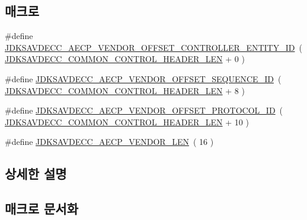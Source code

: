 \subsection*{매크로}
\begin{DoxyCompactItemize}
\item 
\#define \hyperlink{group__aecp__vendor_ga35db9ab2969950eb2f60b85451701a8f}{J\+D\+K\+S\+A\+V\+D\+E\+C\+C\+\_\+\+A\+E\+C\+P\+\_\+\+V\+E\+N\+D\+O\+R\+\_\+\+O\+F\+F\+S\+E\+T\+\_\+\+C\+O\+N\+T\+R\+O\+L\+L\+E\+R\+\_\+\+E\+N\+T\+I\+T\+Y\+\_\+\+ID}~( \hyperlink{group__jdksavdecc__avtp__common__control__header_gaae84052886fb1bb42f3bc5f85b741dff}{J\+D\+K\+S\+A\+V\+D\+E\+C\+C\+\_\+\+C\+O\+M\+M\+O\+N\+\_\+\+C\+O\+N\+T\+R\+O\+L\+\_\+\+H\+E\+A\+D\+E\+R\+\_\+\+L\+EN} + 0 )
\item 
\#define \hyperlink{group__aecp__vendor_gad7cb4c2aee7217166a1d64ff3939ded9}{J\+D\+K\+S\+A\+V\+D\+E\+C\+C\+\_\+\+A\+E\+C\+P\+\_\+\+V\+E\+N\+D\+O\+R\+\_\+\+O\+F\+F\+S\+E\+T\+\_\+\+S\+E\+Q\+U\+E\+N\+C\+E\+\_\+\+ID}~( \hyperlink{group__jdksavdecc__avtp__common__control__header_gaae84052886fb1bb42f3bc5f85b741dff}{J\+D\+K\+S\+A\+V\+D\+E\+C\+C\+\_\+\+C\+O\+M\+M\+O\+N\+\_\+\+C\+O\+N\+T\+R\+O\+L\+\_\+\+H\+E\+A\+D\+E\+R\+\_\+\+L\+EN} + 8 )
\item 
\#define \hyperlink{group__aecp__vendor_gaabcbf488c312106438cf554c418de5d1}{J\+D\+K\+S\+A\+V\+D\+E\+C\+C\+\_\+\+A\+E\+C\+P\+\_\+\+V\+E\+N\+D\+O\+R\+\_\+\+O\+F\+F\+S\+E\+T\+\_\+\+P\+R\+O\+T\+O\+C\+O\+L\+\_\+\+ID}~( \hyperlink{group__jdksavdecc__avtp__common__control__header_gaae84052886fb1bb42f3bc5f85b741dff}{J\+D\+K\+S\+A\+V\+D\+E\+C\+C\+\_\+\+C\+O\+M\+M\+O\+N\+\_\+\+C\+O\+N\+T\+R\+O\+L\+\_\+\+H\+E\+A\+D\+E\+R\+\_\+\+L\+EN} + 10 )
\item 
\#define \hyperlink{group__aecp__vendor_ga0990c9611ccba4fb9c53c02c431efcbb}{J\+D\+K\+S\+A\+V\+D\+E\+C\+C\+\_\+\+A\+E\+C\+P\+\_\+\+V\+E\+N\+D\+O\+R\+\_\+\+L\+EN}~( 16 )
\end{DoxyCompactItemize}


\subsection{상세한 설명}


\subsection{매크로 문서화}
